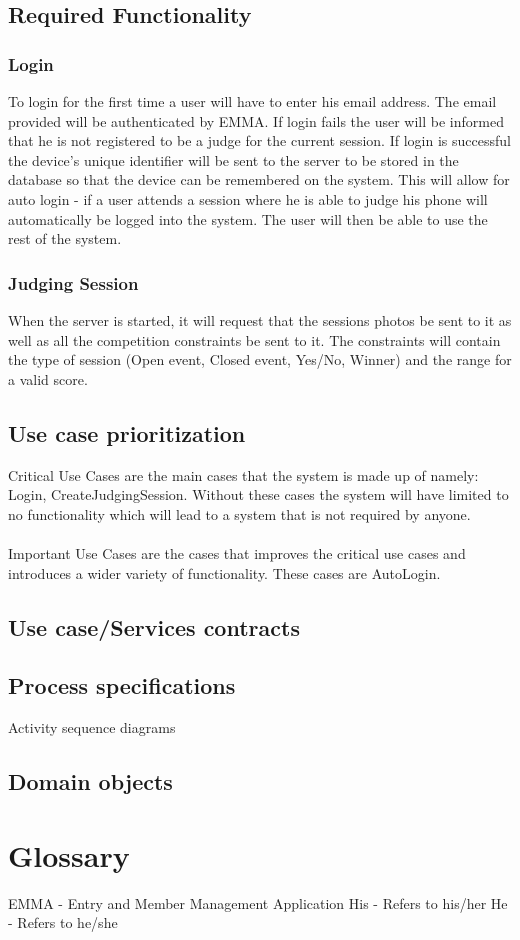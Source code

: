 \documentclass[10pt,a4paper]{article}
\begin{document}
\subsection{Required Functionality}
\subsubsection{Login}
To login for the first time a user will have to enter his email address. The email provided will be authenticated by EMMA. If login fails the user will be informed that he is not registered to be a judge for the current session. If login is successful the device's unique identifier will be sent to the server to be stored in the database so that the device can be remembered on the system. This will allow for auto login - if a user attends a session where he is able to judge his phone will automatically be logged into the system. The user will then be able to use the rest of the system.
\subsubsection{Judging Session}
When the server is started, it will request that the sessions photos be sent to it as well as all the competition constraints be sent to it. The constraints will contain the type of session (Open event, Closed event, Yes/No, Winner) and the range for a valid score.
\subsection{Use case prioritization}
Critical Use Cases are the main cases that the system is made up of namely: Login, CreateJudgingSession. Without these cases the system will have limited to no functionality which will lead to a system that is not required by anyone.
\\ \\
Important Use Cases are the cases that improves the critical use cases and introduces a wider variety of functionality. These cases are AutoLogin.


\subsection{Use case/Services contracts}
\subsection{Process specifications}
Activity sequence diagrams
\subsection{Domain objects}
\section{Glossary}
EMMA - Entry and Member Management Application
His - Refers to his/her
He - Refers to he/she
\end{document}
